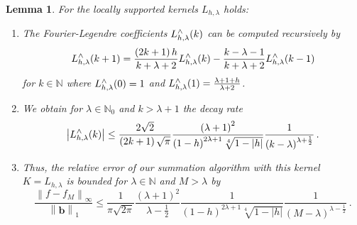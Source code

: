 \documentclass[11pt,a4paper,twoside,bibtotoc]{scrartcl}
\theoremstyle{plain}
\newtheorem{lemma}[theorem]{Lemma}
\theoremstyle{definition}
\theoremstyle{remark}
\newcommand{\N}{\ensuremath{\mathbb{N}}}
\newcommand{\NZ}{\ensuremath{\mathbb{N}_{0}}}
\newcommand{\fun}[2]{\ensuremath{#1{\hspace{-0.4ex}}\left(#2\right)}}
\newcommand{\paren}[1]{\ensuremath{\left(#1\right)}}
\newcommand{\mb}[1]{\mathbf{#1}}
\newcommand{\V}[1]{\mb{#1}}
\numberwithin{equation}{section}
\numberwithin{table}{section}
\numberwithin{figure}{section}
\begin{document}
\begin{lemma}
  For the locally supported kernels $L_{h,\lambda}$ holds:
  \begin{enumerate}
  \item The Fourier-Legendre coefficients $\fun{L_{h,\lambda}^{\wedge}}{k}$ can be computed recursively by
    \[
    \fun{L_{h,\lambda}^{\wedge}}{k+1} = \frac{\paren{2k+1} h}{k+\lambda+2}
    \fun{L_{h,\lambda}^{\wedge}}{k}   - \frac{k-\lambda-1}{k+\lambda+2}
    \fun{L_{h,\lambda}^{\wedge}}{k-1}
    \]
    for $k\in \N$ where $\fun{L_{h,\lambda}^{\wedge}}{0} = 1$ and
    $\fun{L_{h,\lambda}^{\wedge}}{1} = \frac{\lambda + 1 + h}{\lambda+2}$.
  \item We obtain for $\lambda \in \NZ$ and $k>\lambda+1$ the decay rate
    \[
    \left|\fun{L_{h,\lambda}^{\wedge}}{k}\right| \le
    \frac{2\sqrt{2}}{\paren{2k+1}\sqrt{\pi}}
    \frac{\paren{\lambda+1}^2}{\paren{1-h}^{2\lambda+1}\sqrt[4]{1-|h|}}
    \frac{1}{\paren{k-\lambda}^{\lambda+\frac{1}{2}}}\,. 
    \]
  \item Thus, the relative error of our summation algorithm with this kernel
  $K=L_{h,\lambda}$ is bounded for $\lambda \in \N$ and $M>\lambda$ by
  \begin{equation}
    \label{error:Lh}
    \frac{\left\|f - f_{M}\right\|_{\infty}}{\left\|\V{b}\right\|_1} \le
    \frac{1}{\pi\sqrt{2\pi}}
    \frac{\paren{\lambda+1}^2}{\lambda-\frac{1}{2}}
    \frac{1}{\paren{1-h}^{2\lambda+1}\sqrt[4]{1-|h|}}
    \frac{1}{\paren{M-\lambda}^{\lambda-\frac{1}{2}}}\,.
  \end{equation}
  \end{enumerate}
\end{lemma}
\end{document}
